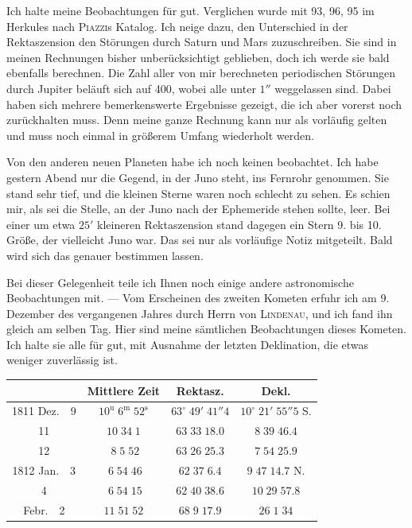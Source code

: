 \par\indent Ich halte meine Beobachtungen für gut. Verglichen wurde mit 93, 96, 95 im Herkules nach \textsc{Piazzi}s Katalog. Ich neige dazu, den Unterschied in der Rektaszension den Störungen durch Saturn und Mars zuzuschreiben. Sie sind in meinen Rechnungen bisher unberücksichtigt geblieben, doch ich werde sie bald ebenfalls berechnen. Die Zahl aller von mir berechneten periodischen Störungen durch Jupiter beläuft sich auf 400, wobei alle unter $1''$ weggelassen sind. Dabei haben sich mehrere bemerkenswerte Ergebnisse gezeigt, die ich aber vorerst noch zurückhalten muss. Denn meine ganze Rechnung kann nur als vorläufig gelten und muss noch einmal in größerem Umfang wiederholt werden.

\par\indent Von den anderen neuen Planeten habe ich noch keinen beobachtet. Ich habe gestern Abend nur die Gegend, in der Juno steht, ins Fernrohr genommen. Sie stand sehr tief, und die kleinen Sterne waren noch schlecht zu sehen. Es schien mir, als sei die Stelle, an der Juno nach der Ephemeride stehen sollte, leer. Bei einer um etwa $25'$ kleineren Rektaszension stand dagegen ein Stern 9. bis 10. Größe, der vielleicht Juno war. Das sei nur als vorläufige Notiz mitgeteilt. Bald wird sich das genauer bestimmen lassen.

\par\indent Bei dieser Gelegenheit teile ich Ihnen noch einige andere astronomische Beobachtungen mit. — Vom Erscheinen des zweiten Kometen erfuhr ich am 9. Dezember des vergangenen Jahres durch Herrn von \textsc{Lindenau}, und ich fand ihn gleich am selben Tag. Hier sind meine sämtlichen Beobachtungen dieses Kometen. Ich halte sie alle für gut, mit Ausnahme der letzten Deklination, die etwas weniger zuverlässig ist.

\begin{center}
\fontsize{10}{12}\selectfont\setlength{\tabcolsep}{3pt}\renewcommand{\arraystretch}{1.15}\begin{tabular}{c|c|c|c}
 & Mittlere Zeit & Rektasz. & Dekl. \\
\hline
1811 Dez.\ \ 9 & $10^{\mathrm u}\;6^{\mathrm m}\;52^{\mathrm s}$ & $63^\circ\;49'\;41''4$ & $10^\circ\;21'\;55''5$ S. \\
11 & $10\;34\;1$ & $63\;33\;18.0$ & $8\;39\;46.4$ \\
12 & $\;8\;5\;52$ & $63\;26\;25.3$ & $7\;54\;25.9$ \\
1812 Jan.\ \ 3 & $\;6\;54\;46$ & $62\;37\;6.4$ & $9\;47\;14.7$ N. \\
4 & $\;6\;54\;15$ & $62\;40\;38.6$ & $10\;29\;57.8$ \\
Febr.\ \ 2 & $11\;51\;52$ & $68\;9\;17.9$ & $26\;1\;34$ \\
\end{tabular}
\end{center}

